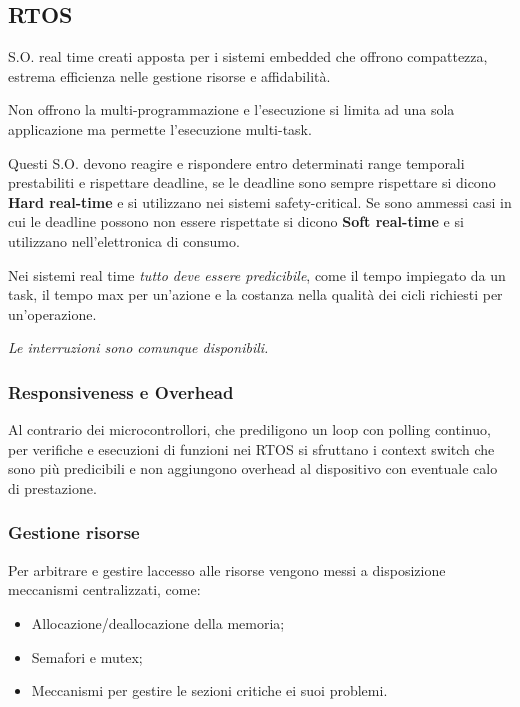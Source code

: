 \subsection{RTOS}\label{rtos}

S.O. real time creati apposta per i sistemi embedded che offrono
compattezza, estrema efficienza nelle gestione risorse e affidabilità.

Non offrono la multi-programmazione e l'esecuzione si limita ad una sola
applicazione ma permette l'esecuzione multi-task.

Questi S.O. devono reagire e rispondere entro determinati range
temporali prestabiliti e rispettare deadline, se le deadline sono sempre
rispettare si dicono \textbf{Hard real-time} e si utilizzano nei sistemi
safety-critical. Se sono ammessi casi in cui le deadline possono non
essere rispettate si dicono \textbf{Soft real-time} e si utilizzano
nell'elettronica di consumo.

Nei sistemi real time \emph{tutto deve essere predicibile}, come il
tempo impiegato da un task, il tempo max per un'azione e la costanza
nella qualità dei cicli richiesti per un'operazione.

\emph{Le interruzioni sono comunque disponibili.}

\subsubsection{Responsiveness e
Overhead}\label{responsiveness-e-overhead}

Al contrario dei microcontrollori, che prediligono un loop con polling
continuo, per verifiche e esecuzioni di funzioni nei RTOS si sfruttano i
context switch che sono più predicibili e non aggiungono overhead al
dispositivo con eventuale calo di prestazione.

\subsubsection{Gestione risorse}\label{gestione-risorse}

Per arbitrare e gestire l\textquotesingle accesso alle risorse vengono
messi a disposizione meccanismi centralizzati, come:

\begin{itemize}
\item
  Allocazione/deallocazione della memoria;
\item
  Semafori e mutex;
\item
  Meccanismi per gestire le sezioni critiche ei suoi problemi.
\end{itemize}

